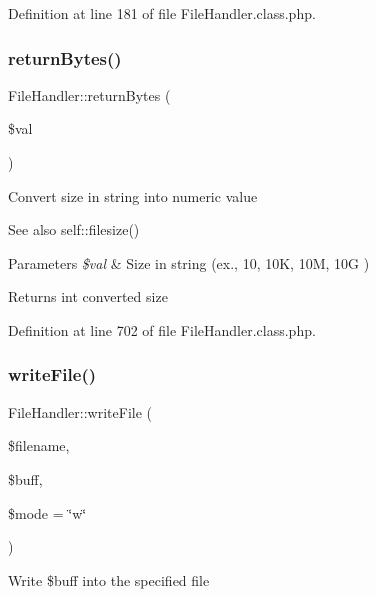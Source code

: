 Definition at line 181 of file File\+Handler.\+class.\+php.

\mbox{\label{classFileHandler_a79dd068137470965b560f4d23d978e7d}} 
\subsubsection{\texorpdfstring{return\+Bytes()}{returnBytes()}}
{\footnotesize\ttfamily File\+Handler\+::return\+Bytes (\begin{DoxyParamCaption}\item[{}]{\$val }\end{DoxyParamCaption})}

Convert size in string into numeric value

\begin{DoxySeeAlso}{See also}
self\+::filesize() 
\end{DoxySeeAlso}

\begin{DoxyParams}{Parameters}
{\em \$val} & Size in string (ex., 10, 10K, 10M, 10G ) \\
\hline
\end{DoxyParams}
\begin{DoxyReturn}{Returns}
int converted size 
\end{DoxyReturn}


Definition at line 702 of file File\+Handler.\+class.\+php.

\mbox{\label{classFileHandler_ad90c10a81460f437bc68952427606155}} 
\subsubsection{\texorpdfstring{write\+File()}{writeFile()}}
{\footnotesize\ttfamily File\+Handler\+::write\+File (\begin{DoxyParamCaption}\item[{}]{\$filename,  }\item[{}]{\$buff,  }\item[{}]{\$mode = {\ttfamily \char`\"{}w\char`\"{}} }\end{DoxyParamCaption})}

Write \$buff into the specified file


